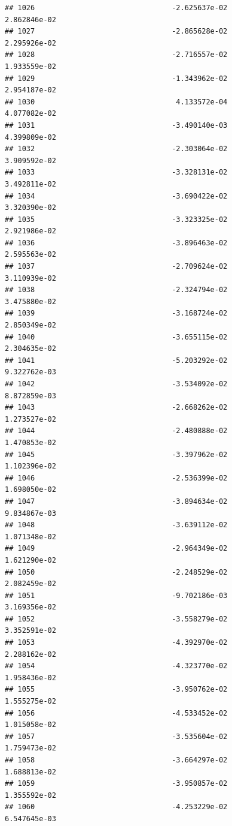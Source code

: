\documentclass[
]{article}
\begin{document}
\begin{verbatim}
## 1026                                -2.625637e-02           2.862846e-02
## 1027                                -2.865628e-02           2.295926e-02
## 1028                                -2.716557e-02           1.933559e-02
## 1029                                -1.343962e-02           2.954187e-02
## 1030                                 4.133572e-04           4.077082e-02
## 1031                                -3.490140e-03           4.399809e-02
## 1032                                -2.303064e-02           3.909592e-02
## 1033                                -3.328131e-02           3.492811e-02
## 1034                                -3.690422e-02           3.320390e-02
## 1035                                -3.323325e-02           2.921986e-02
## 1036                                -3.896463e-02           2.595563e-02
## 1037                                -2.709624e-02           3.110939e-02
## 1038                                -2.324794e-02           3.475880e-02
## 1039                                -3.168724e-02           2.850349e-02
## 1040                                -3.655115e-02           2.304635e-02
## 1041                                -5.203292e-02           9.322762e-03
## 1042                                -3.534092e-02           8.872859e-03
## 1043                                -2.668262e-02           1.273527e-02
## 1044                                -2.480888e-02           1.470853e-02
## 1045                                -3.397962e-02           1.102396e-02
## 1046                                -2.536399e-02           1.698050e-02
## 1047                                -3.894634e-02           9.834867e-03
## 1048                                -3.639112e-02           1.071348e-02
## 1049                                -2.964349e-02           1.621290e-02
## 1050                                -2.248529e-02           2.082459e-02
## 1051                                -9.702186e-03           3.169356e-02
## 1052                                -3.558279e-02           3.352591e-02
## 1053                                -4.392970e-02           2.288162e-02
## 1054                                -4.323770e-02           1.958436e-02
## 1055                                -3.950762e-02           1.555275e-02
## 1056                                -4.533452e-02           1.015058e-02
## 1057                                -3.535604e-02           1.759473e-02
## 1058                                -3.664297e-02           1.688813e-02
## 1059                                -3.950857e-02           1.355592e-02
## 1060                                -4.253229e-02           6.547645e-03

\end{verbatim}
\end{document}
